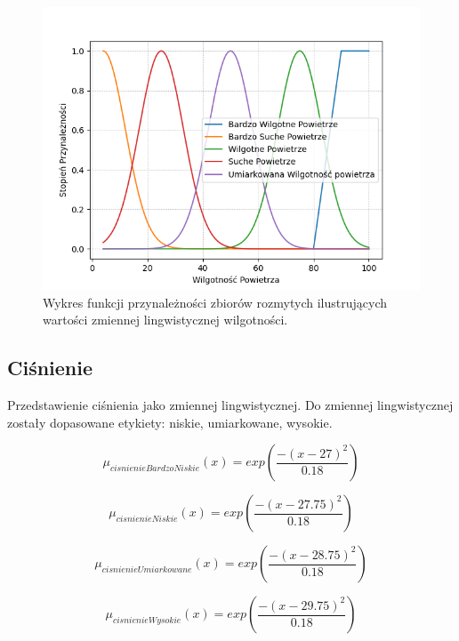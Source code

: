 \documentclass{classrep}
\begin{document}
\begin{figure}[h!]
\centering
\includegraphics[width=14cm]{FunkcjaPrzynaleznosciWilgotnosc.png}
\vspace{-0.3cm}
\caption{Wykres funkcji przynależności zbiorów rozmytych ilustrujących wartości zmiennej lingwistycznej wilgotności. }
\label{rysunek do eksperymentu 1 wariantu 1}
\end{figure}
\newpage


\subsection{Ciśnienie}
Przedstawienie ciśnienia jako zmiennej lingwistycznej. Do zmiennej lingwistycznej zostały dopasowane etykiety: niskie, umiarkowane, wysokie.

\begin{equation}
\mu _{cisnienieBardzoNiskie}(x) = exp( \frac{- (x - 27)^2}{0.18} )
\end{equation}

\begin{equation}
\mu _{cisnienieNiskie}(x) = exp( \frac{- (x - 27.75)^2}{0.18} )
\end{equation}

\begin{equation}
\mu _{cisnienieUmiarkowane}(x) = exp( \frac{- (x - 28.75)^2}{0.18} )
\end{equation}

\begin{equation}
\mu _{cisnienieWysokie}(x) = exp( \frac{- (x - 29.75)^2}{0.18} )
\end{equation}
\end{document}
